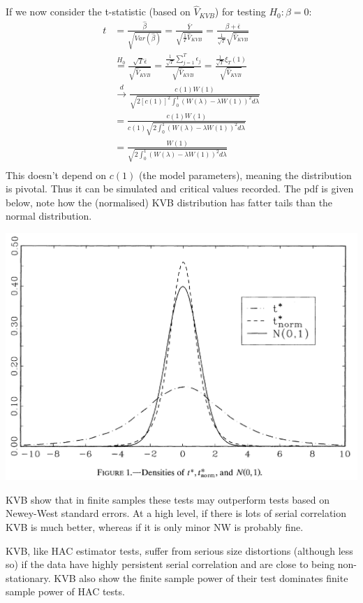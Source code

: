 \documentclass[DIV=14,titlepage=false]{scrreprt}
\begin{document}
If we now consider the t-statistic (based on $\hat V_{KVB}$) for testing $H_0: \beta=0$:
\begin{align*}
    t &= \frac{\hat \beta}{\sqrt{Var(\hat \beta)}}
    = \frac{\bar Y}{\sqrt{\frac{1}{T} \hat V_{KVB}}}
    = \frac{\beta + \bar \epsilon}{\frac{1}{\sqrt{T}}\sqrt{\hat V_{KVB}}}\\
    &\overset{H_0}{=} \frac{\sqrt{T}\bar \epsilon}{ \sqrt{\hat V_{KVB}}}
    = \frac{\frac{1}{\sqrt{T}}\sum_{j=1}^{T}\epsilon_j}{\sqrt{\hat V_{KVB}}}
    = \frac{\frac{1}{\sqrt{T}}\xi_T(1)}{\sqrt{\hat V_{KVB}}}\\
    &\xrightarrow{d} \frac{c(1)W(1)}{\sqrt{2 [c(1)]^2 \int_{0}^{1} \left(W(\lambda) -\lambda W(1)\right)^2 d \lambda}}\\
    &= \frac{c(1)W(1)}{c(1)\sqrt{2 \int_{0}^{1} \left(W(\lambda) -\lambda W(1)\right)^2 d \lambda}}\\
    &= \frac{W(1)}{\sqrt{2 \int_{0}^{1} \left(W(\lambda) -\lambda W(1)\right)^2 d \lambda}}\\
\end{align*}
This doesn't depend on $c(1)$ (the model parameters), meaning the distribution is pivotal. Thus it can be simulated and critical values recorded. The pdf is given below, note how the (normalised) KVB distribution has fatter tails than the normal distribution.

\includegraphics[width=\textwidth]{./Images/KVB.png}

KVB show that in finite samples these tests may outperform tests based on Newey-West standard errors. At a high level, if there is lots of serial correlation KVB is much better, whereas if it is only minor NW is probably fine. 

KVB, like HAC estimator tests, suffer from serious size distortions (although less so) if the data have highly persistent serial correlation and are close to being non-stationary. KVB also show the finite sample power of their test dominates finite sample power of HAC tests.
\end{document}
